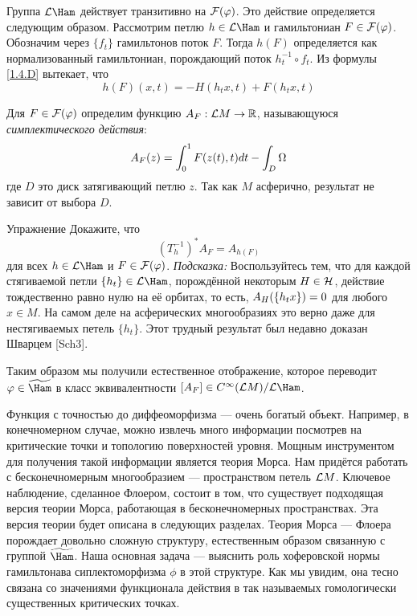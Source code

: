 Группа $\L\Ham$ действует транзитивно на $\mathcal{F}(\varphi)$. Это
действие определяется следующим образом. Рассмотрим петлю $h\in\L\Ham$ и
гамильтониан $F\in\mathcal{F}(\varphi)$. Обозначим через $\{f_{t}\}$
гамильтонов поток $F$.
Тогда $h(F)$ определяется как нормализованный гамильтониан, порождающий поток
$h^{-1}_{t}\circ f_{t}$.
Из формулы \ref{1.4.D} вытекает, что
\[
h(F)(x,t) = -H(h_{t}x,t) + F(h_{t}x,t)
\]

Для $F\in\mathcal{F}(\varphi)$ определим функцию $A_{F}:\mathcal{L} M\to\mathbb{R}$,
называющуюся \textit{ симплектического действия}:
\[
A_{F}(z)=\int_{0}^{1}F(z(t),t)d t - \int_{D}\Omega
\]
где $D$ это диск затягивающий петлю $z$.
Так как $M$ асферично, результат не зависит от выбора $D$.

\begin{ex}{Упражнение}\label{13.1.A}
Докажите, что
\[
(T_{h}^{-1})^{*}A_{F}= A _{h(F)}
\]
для всех $h\in\L\Ham$ и $F\in\mathcal{F}(\varphi)$.
\textit{Подсказка:}
Воспользуйтесь тем, что для каждой стягиваемой петли $\{h_{t}\}\in\L\Ham$, порождённой некоторым $H\in\mathcal{H}$, действие тождественно равно нулю на её орбитах, то есть, $A_{H}(\{h_{t}x\}) \z= 0$ для любого $x\in M$.
На самом деле на асферических многообразиях это верно даже для нестягиваемых петель $\{h_{t}\}$.
Этот трудный результат был недавно доказан Шварцем [Sch3].
\end{ex}

Таким образом мы получили естественное отображение, которое переводит
$\phi\in\widetilde\Ham$ в класс эквивалентности $[A_{F}]\in C^{\infty} (\L M)/\L\Ham$.

Функция с точностью до диффеоморфизма — очень богатый объект.
Например, в конечномерном случае, можно извлечь много информации посмотрев на критические точки и топологию поверхностей уровня.
Мощным инструментом для получения такой информации является теория Морса.
Нам придётся работать с бесконечномерным многообразием --- пространством петель $\mathcal{L} M$.
Ключевое наблюдение, сделанное Флоером, состоит в том, что существует подходящая версия теории Морса, работающая в бесконечномерных пространствах.
Эта версия теории будет описана в следующих разделах.
Теория Морса --- Флоера порождает довольно сложную структуру, естественным образом связанную 
с группой $\widetilde\Ham$.
Наша основная задача --- выяснить роль
хоферовской нормы гамильтонава сиплектоморфизма $\phi$ в этой структуре.
Как мы увидим, она тесно связана со значениями функционала действия
в так называемых гомологически существенных критических точках. 

